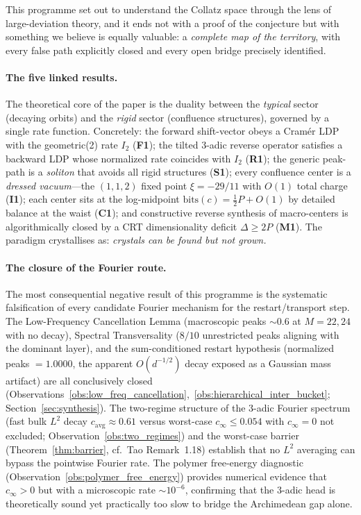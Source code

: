 \documentclass[12pt,a4paper]{article}
\begin{document}
This programme set out to understand the Collatz space through the lens of
large-deviation theory, and it ends not with a proof of the conjecture but
with something we believe is equally valuable: a \emph{complete map of the
territory}, with every false path explicitly closed and every open bridge
precisely identified.

\paragraph{The five linked results.}
The theoretical core of the paper is the duality between the \emph{typical}
sector (decaying orbits) and the \emph{rigid} sector (confluence structures),
governed by a single rate function.  Concretely: the forward shift-vector
obeys a Cram\'er LDP with the geometric(2) rate $I_2$ (\textbf{F1}); the
tilted $3$-adic reverse operator satisfies a backward LDP whose normalized
rate coincides with $I_2$ (\textbf{R1}); the generic peak-path is a
\emph{soliton} that avoids all rigid structures (\textbf{S1}); every
confluence center is a \emph{dressed vacuum}---the $(1,1,2)$ fixed point
$\xi=-29/11$ with $O(1)$ total charge (\textbf{I1}); each center sits at the
log-midpoint $\mathrm{bits}(c)=\tfrac12 P+O(1)$ by detailed balance at the
waist (\textbf{C1}); and constructive reverse synthesis of macro-centers is
algorithmically closed by a CRT dimensionality deficit $\Delta\ge 2P$
(\textbf{M1}).  The paradigm crystallises as: \emph{crystals can be found but
not grown.}

\paragraph{The closure of the Fourier route.}
The most consequential negative result of this programme is the systematic
falsification of every candidate Fourier mechanism for the restart/transport
step.  The Low-Frequency Cancellation Lemma (macroscopic peaks $\sim0.6$ at
$M=22,24$ with no decay), Spectral Transversality ($8/10$ unrestricted peaks
aligning with the dominant layer), and the sum-conditioned restart hypothesis
(normalized peaks $=1.0000$, the apparent $O(d^{-1/2})$ decay exposed as a
Gaussian mass artifact) are all conclusively closed
(Observations~\ref{obs:low_freq_cancellation},~\ref{obs:hierarchical_inter_bucket};
Section~\ref{sec:synthesis}).  The two-regime structure of the $3$-adic
Fourier spectrum (fast bulk $L^2$ decay $c_{\mathrm{avg}}\approx0.61$ versus
worst-case $c_\infty\le0.054$ with $c_\infty=0$ not excluded;
Observation~\ref{obs:two_regimes}) and the worst-case barrier
(Theorem~\ref{thm:barrier}, cf.\ Tao Remark~1.18) establish that no $L^2$
averaging can bypass the pointwise Fourier rate.  The polymer free-energy
diagnostic (Observation~\ref{obs:polymer_free_energy}) provides numerical
evidence that $c_\infty>0$ but with a microscopic rate $\sim10^{-6}$,
confirming that the $3$-adic head is theoretically sound yet practically too
slow to bridge the Archimedean gap alone.
\end{document}
